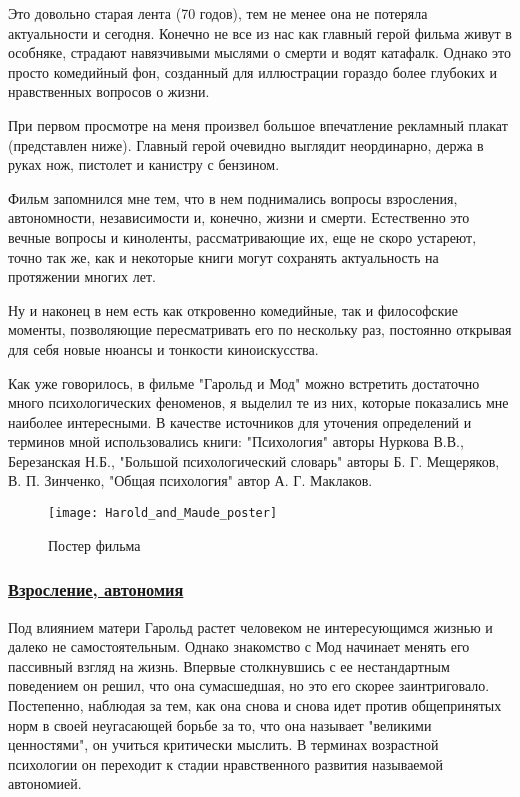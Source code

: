 \documentclass[a4paper,12pt]{report} %
\begin{document}
Это довольно старая лента (70 годов), тем не менее она не потеряла актуальности и сегодня. Конечно не все из нас как главный герой фильма живут в особняке, страдают навязчивыми мыслями о смерти и водят катафалк. Однако это просто комедийный фон, созданный для иллюстрации гораздо более глубоких и нравственных вопросов о жизни. 

При первом просмотре на меня произвел большое впечатление рекламный плакат (представлен ниже). Главный герой очевидно выглядит неординарно, держа в руках нож, пистолет и канистру с бензином.

Фильм запомнился мне тем, что в нем поднимались вопросы взросления, автономности, независимости и, конечно, жизни и смерти. Естественно это вечные вопросы и киноленты, рассматривающие их, еще не скоро устареют, точно так же, как и некоторые книги могут сохранять актуальность на протяжении многих лет.

Ну и наконец в нем есть как откровенно комедийные, так и философские моменты, позволяющие пересматривать его по нескольку раз, постоянно открывая для себя новые нюансы и тонкости киноискусства.

Как уже говорилось, в фильме "Гарольд и Мод" можно встретить достаточно много психологических феноменов, я выделил те из них, которые показались мне наиболее интересными. В качестве источников для уточения определений и терминов мной использовались книги:  "Психология" авторы Нуркова В.В., Березанская Н.Б., "Большой психологический словарь" авторы Б. Г. Мещеряков, В. П. Зинченко, "Общая психология" автор  А. Г. Маклаков.


\begin{figure}[!h]
	\centering
	\texttt{[image: Harold\_and\_Maude\_poster]}
	\caption{Постер фильма}
\end{figure}

\newpage


\subsubsection{\underline{Взросление, автономия}}

Под влиянием матери Гарольд растет человеком не интересующимся жизнью и далеко не самостоятельным. Однако знакомство с Мод начинает менять его пассивный взгляд на жизнь. Впервые столкнувшись с ее нестандартным поведением он решил, что она сумасшедшая, но это его скорее заинтриговало. Постепенно, наблюдая за тем, как она снова и снова идет против общепринятых норм в своей неугасающей борьбе за то, что она называет "великими ценностями", он учиться критически мыслить.  В терминах возрастной психологии он переходит к стадии нравственного развития называемой автономией.
\end{document}
